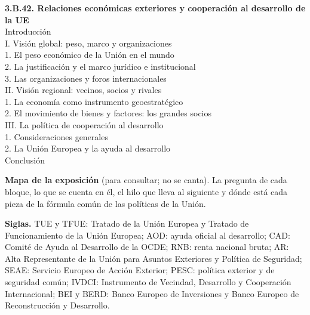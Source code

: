 \documentclass[11pt]{article}
\begin{document}
\begin{esquema}[unbreakable]
\textbf{3.B.42. Relaciones económicas exteriores y cooperación al desarrollo de la UE}\\[2pt]
Introducción\\
I. Visión global: peso, marco y organizaciones\\
\hspace*{1.5em}1. El peso económico de la Unión en el mundo\\
\hspace*{1.5em}2. La justificación y el marco jurídico e institucional\\
\hspace*{1.5em}3. Las organizaciones y foros internacionales\\
II. Visión regional: vecinos, socios y rivales\\
\hspace*{1.5em}1. La economía como instrumento geoestratégico\\
\hspace*{1.5em}2. El movimiento de bienes y factores: los grandes socios\\
III. La política de cooperación al desarrollo\\
\hspace*{1.5em}1. Consideraciones generales\\
\hspace*{1.5em}2. La Unión Europea y la ayuda al desarrollo\\
Conclusión
\end{esquema}

\begin{anotaciones}
\textbf{Mapa de la exposición} (para consultar; no se canta). La pregunta de cada bloque, lo que se cuenta en él, el hilo que lleva al siguiente y dónde está cada pieza de la fórmula común de las políticas de la Unión.
\begin{infografiacaja}
\caption{Mapa de la exposición: la pregunta de cada bloque y el hilo que los une}\label{figu:mapa-tema}
\end{infografiacaja}
\end{anotaciones}

\begin{anotaciones}
\textbf{Siglas.} TUE y TFUE: Tratado de la Unión Europea y Tratado de Funcionamiento de la Unión Europea; AOD: ayuda oficial al desarrollo; CAD: Comité de Ayuda al Desarrollo de la OCDE; RNB: renta nacional bruta; AR: Alta Representante de la Unión para Asuntos Exteriores y Política de Seguridad; SEAE: Servicio Europeo de Acción Exterior; PESC: política exterior y de seguridad común; IVDCI: Instrumento de Vecindad, Desarrollo y Cooperación Internacional; BEI y BERD: Banco Europeo de Inversiones y Banco Europeo de Reconstrucción y Desarrollo.
\end{anotaciones}
\end{document}

